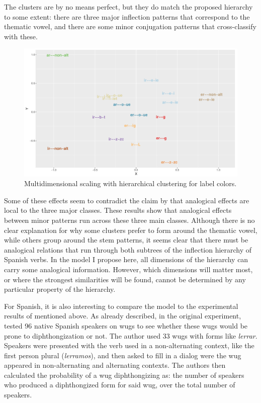 The clusters are by no means perfect, but they do match the proposed hierarchy to some extent: there are three major inflection patterns that correspond to the thematic vowel, and there are some minor conjugation patterns that cross-classify with these.

\begin{figure}[!htpb]
  \centering
  \includegraphics[scale=0.68, angle=90]{./figures/spanish/spanish-verbs-clust-sim1.pdf}
  \caption{Multidimensional scaling with hierarchical clustering for label colors.}\label{fig:sp-fanny-infl}
\end{figure}

Some of these effects seem to contradict the claim by \textcite{Albright.2009} that analogical effects are local to the three major classes. These results show that analogical effects between minor patterns run across these three main classes. Although there is no clear explanation for why some clusters prefer to form around the thematic vowel, while others group around the stem patterns, it seems clear that there must be analogical relations that run through both subtrees of the inflection hierarchy of Spanish verbs. In the model I propose here, all dimensions of the hierarchy can carry some analogical information. However, which dimensions will matter most, or where  the strongest similarities will be found, cannot be determined by any particular property of the hierarchy.

For Spanish, it is also interesting to compare the model to the experimental results of \textcite{Albright.2009} mentioned above. As already described, in the original experiment, \textcite{Albright.2001} tested 96 native Spanish speakers on wugs to see whether these wugs would be prone to diphthongization or not. The author used 33 wugs with forms like \textit{lerrar}. Speakers were presented with the verb used in a non-alternating context, like the first person plural (\textit{lerramos}), and then asked to fill in a dialog were the wug appeared in non-alternating and alternating contexts. The authors then calculated the probability of a wug diphthongizing as: the number of speakers who produced a diphthongized form for said wug, over the total number of speakers.


